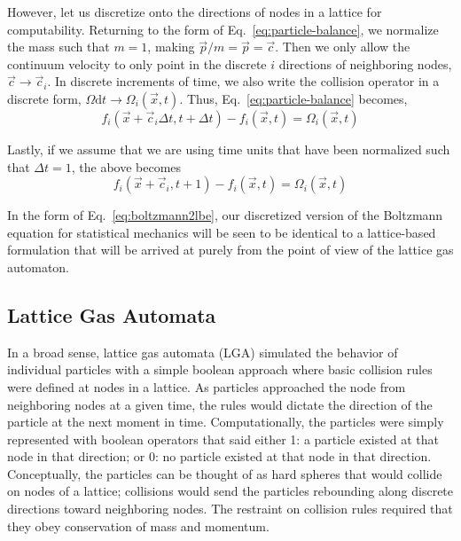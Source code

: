 However, let us discretize onto the directions of nodes in a lattice for computability. Returning to the form of Eq.~\ref{eq:particle-balance}, we normalize the mass such that $m=1$, making $\vec{p}/m = \vec{p}=\vec{c}$. Then we only allow the continuum velocity to only point in the discrete $i$ directions of neighboring nodes, $\vec{c}\rightarrow\vec{c}_i$. In discrete increments of time, we also write the collision operator in a discrete form, $\Omega\mathrm{d}t \rightarrow \Omega_i(\vec{x},t)$. Thus, Eq.~\ref{eq:particle-balance} becomes,
\begin{equation}
	f_i(\vec{x}+\vec{c}_i\Delta t, t + \Delta t) - f_i(\vec{x},t) = \Omega_i(\vec{x},t)
\end{equation}

Lastly, if we assume that we are using time units that have been normalized such that $\Delta t = 1$, the above becomes
\begin{equation}\label{eq:boltzmann2lbe}
	f_i(\vec{x}+\vec{c}_i, t + 1) - f_i(\vec{x},t) = \Omega_i(\vec{x},t)
\end{equation}

In the form of Eq.~\ref{eq:boltzmann2lbe}, our discretized version of the Boltzmann equation for statistical mechanics will be seen to be identical to a lattice-based formulation that will be arrived at purely from the point of view of the lattice gas automaton.



\subsection{Lattice Gas Automata}

In a broad sense, lattice gas automata (LGA) simulated the behavior of individual particles with a simple boolean approach where basic collision rules were defined at nodes in a lattice. As particles approached the node from neighboring nodes at a given time, the rules would dictate the direction of the particle at the next moment in time. Computationally, the particles were simply represented with boolean operators that said either 1: a particle existed at that node in that direction; or 0: no particle existed at that node in that direction. Conceptually, the particles can be thought of as hard spheres that would collide on nodes of a lattice; collisions would send the particles rebounding along discrete directions toward neighboring nodes. The restraint on collision rules required that they obey conservation of mass and momentum. 

